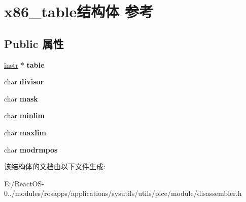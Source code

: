 \hypertarget{structx86__table}{}\section{x86\+\_\+table结构体 参考}
\label{structx86__table}
\subsection*{Public 属性}
\begin{DoxyCompactItemize}
\item 
\mbox{\label{structx86__table_a79233f8adb6069c1c434a495f4d36ac5}} 
\hyperlink{structx86__inst}{instr} $\ast$ {\bfseries table}
\item 
\mbox{\label{structx86__table_a39c66cf660545e6053bc737574cdf2d8}} 
char {\bfseries divisor}
\item 
\mbox{\label{structx86__table_afe70184067e416d2251cf279eb2f308e}} 
char {\bfseries mask}
\item 
\mbox{\label{structx86__table_a0489fbb4d727fc30b539657dd5cc92dd}} 
char {\bfseries minlim}
\item 
\mbox{\label{structx86__table_ab150e5e336b10cab065cf3fcf7b71486}} 
char {\bfseries maxlim}
\item 
\mbox{\label{structx86__table_aa42b3107ff645c842c8d4c8df10d486b}} 
char {\bfseries modrmpos}
\end{DoxyCompactItemize}


该结构体的文档由以下文件生成\+:\begin{DoxyCompactItemize}
\item 
E\+:/\+React\+O\+S-\/0../modules/rosapps/applications/sysutils/utils/pice/module/disassembler.\+h\end{DoxyCompactItemize}
